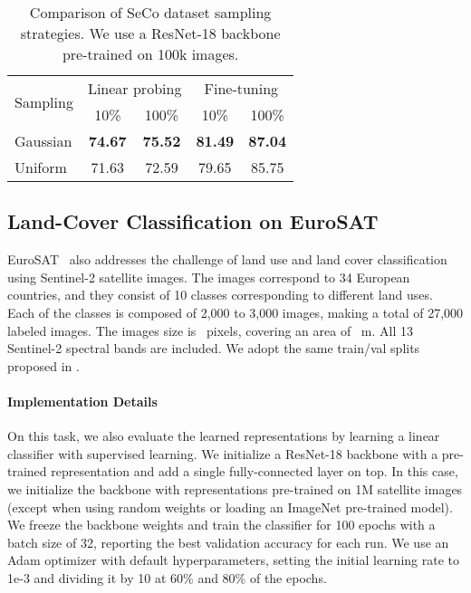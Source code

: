 \documentclass[10pt,twocolumn,letterpaper]{article}
\newcommand{\methodname}[0]{SeCo}
\begin{document}
\begin{table}[t]
    \begin{center}
    \begin{tabular}{l|cccc}
        \toprule
        \multirow{2}{*}{Sampling} & \multicolumn{2}{c}{Linear probing} & \multicolumn{2}{c}{Fine-tuning} \\
        & 10\% & 100\% & 10\% & 100\% \\
        \hline\hline
        Gaussian & \textbf{74.67} & \textbf{75.52} & \textbf{81.49} & \textbf{87.04} \\
        Uniform & 71.63 & 72.59 & 79.65 & 85.75 \\
        \bottomrule
    \end{tabular}
    \end{center}
    \caption{Comparison of \methodname{} dataset sampling strategies. We use a ResNet-18 backbone pre-trained on 100k images.}
    \label{tab:ablation_sampling}
\end{table}

\subsection{Land-Cover Classification on EuroSAT}
EuroSAT~\citep{helber2019eurosat} also addresses the challenge of land use and land cover classification using Sentinel-2 satellite images. The images correspond to 34 European countries, and they consist of 10 classes corresponding to different land uses. Each of the classes is composed of 2,000 to 3,000 images, making a total of 27,000 labeled images. The images size is ~pixels, covering an area of ~m. All 13 Sentinel-2 spectral bands are included. We adopt the same train/val splits proposed in \cite{neumann2019domain}.

\vspace{-1em}\paragraph{Implementation Details}
On this task, we also evaluate the learned representations by learning a linear classifier with supervised learning. We initialize a ResNet-18 backbone with a pre-trained representation and add a single fully-connected layer on top. In this case, we initialize the backbone with representations pre-trained on 1M satellite images (except when using random weights or loading an ImageNet pre-trained model). We freeze the backbone weights and train the classifier for 100 epochs with a batch size of 32, reporting the best validation accuracy for each run. We use an Adam optimizer with default hyperparameters, setting the initial learning rate to 1e-3 and dividing it by 10 at 60\% and 80\% of the epochs.
\end{document}
